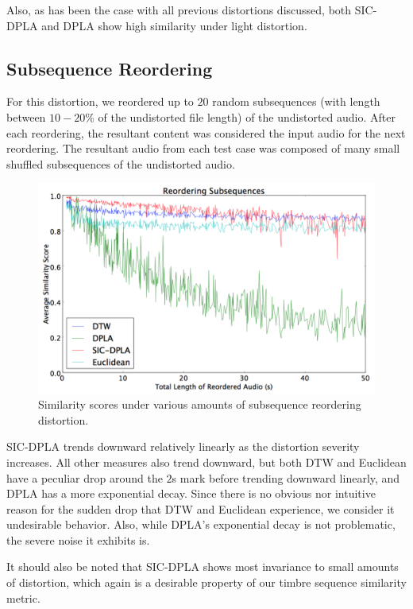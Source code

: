 \documentclass[a4paper,12pt]{report} 	%
\numberwithin{figure}{chapter}
\numberwithin{table}{chapter}
\numberwithin{equation}{chapter}
\begin{document}
\begin{flushleft}
Also, as has been the case with all previous distortions discussed, both SIC-DPLA and DPLA show high similarity under light distortion.

\subsection{Subsequence Reordering}
For this distortion, we reordered up to $20$ random subsequences (with length between $10-20\%$ of the undistorted file length) of the undistorted audio. After each reordering, the resultant content was considered the input audio for the next reordering. The resultant audio from each test case was composed of many small shuffled subsequences of the undistorted audio.
\begin{figure}[h!]
\begin{center}
\includegraphics[scale=0.5,width=\linewidth]{ReorderedAudio}
\caption[Subsequence Reordering Results]{Similarity scores under various amounts of subsequence reordering distortion.}
\end{center}
\end{figure}
SIC-DPLA trends downward relatively linearly as the distortion severity increases. All other measures also trend downward, but both DTW and Euclidean have a peculiar drop around the $2$s mark before trending downward linearly, and DPLA has a more exponential decay. Since there is no obvious nor intuitive reason for the sudden drop that DTW and Euclidean experience, we consider it undesirable behavior. Also, while DPLA's exponential decay is not problematic, the severe noise it exhibits is.

It should also be noted that SIC-DPLA shows most invariance to small amounts of distortion, which again is a desirable property of our timbre sequence similarity metric.


\end{flushleft}
\end{document}
